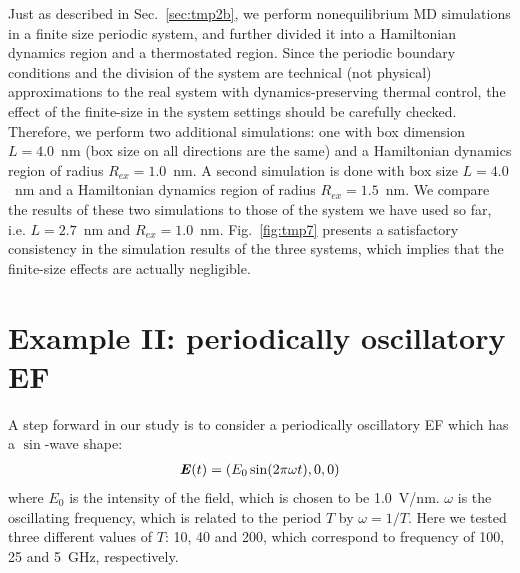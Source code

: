 \documentclass[a4paper,preprint,unsortedaddress,onecolumn]{revtex4-1}
\newcommand{\vect}[1]{\textbf{\textit{#1}}}
\begin{document}
Just as described in Sec.~\ref{sec:tmp2b}, we perform nonequilibrium MD
simulations in a finite size periodic system, and further divided it
into a Hamiltonian dynamics region and a thermostated region.
Since the periodic boundary conditions and the division of the system
are technical (not physical) approximations to the real system with dynamics-preserving thermal control, 
the effect of the finite-size in 
the system settings should be carefully checked.
Therefore, we
perform two additional simulations: one with box dimension $L=4.0$~nm (box size on all directions are the same) and a
Hamiltonian dynamics region of radius $R_{ex} = 1.0$~nm. A second simulation is done with box size $L=4.0$~nm and a Hamiltonian dynamics region of
radius $R_{ex} = 1.5$~nm. We compare the results of these two simulations to those of the system we have used so far, i.e. $L=2.7$~nm and $R_{ex} = 1.0$~nm.
Fig.~\ref{fig:tmp7} presents a satisfactory consistency in
the simulation results of the three systems, which implies that the finite-size effects are
actually negligible.



\section{Example II:
  periodically oscillatory EF}

A step forward in our study is to consider a periodically oscillatory EF which has
a $\sin$-wave shape:
\begin{align}
  \vect E(t) = (E_0\sin(2\pi \omega t), 0, 0)
\end{align}
where $E_0$ is the intensity of the field, which is chosen to be
1.0~V/nm.  $\omega$ is the oscillating frequency, which is related to
the period $T$ by $\omega = 1/T$.  Here we tested three different
values of $T$: 10, 40 and 200, which correspond
to frequency of 100, 25 and 5~GHz, respectively.
\end{document}
